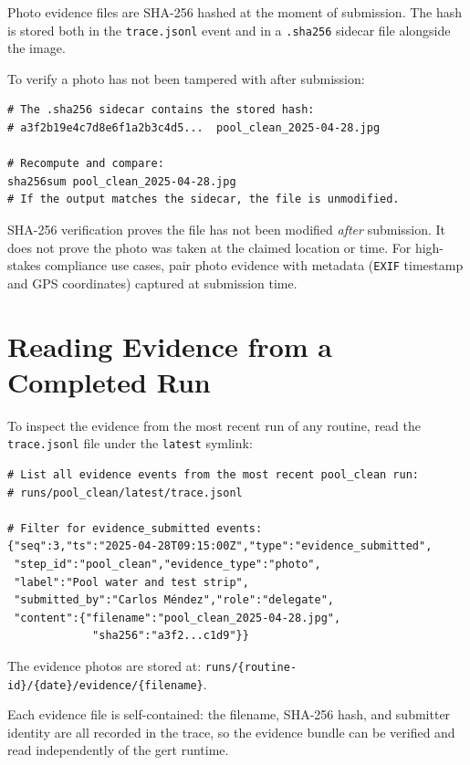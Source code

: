 Photo evidence files are SHA-256 hashed at the moment of submission. The hash is stored both
in the \texttt{trace.jsonl} event and in a \texttt{.sha256} sidecar file alongside the image.

To verify a photo has not been tampered with after submission:

\begin{verbatim}
# The .sha256 sidecar contains the stored hash:
# a3f2b19e4c7d8e6f1a2b3c4d5...  pool_clean_2025-04-28.jpg

# Recompute and compare:
sha256sum pool_clean_2025-04-28.jpg
# If the output matches the sidecar, the file is unmodified.
\end{verbatim}

\begin{tcolorbox}[colback=yellow!10,colframe=orange!70,title=Note]
  SHA-256 verification proves the file has not been modified \emph{after} submission. It does
  not prove the photo was taken at the claimed location or time. For high-stakes compliance
  use cases, pair photo evidence with metadata (\texttt{EXIF} timestamp and GPS coordinates)
  captured at submission time.
\end{tcolorbox}

\section{Reading Evidence from a Completed Run}
\label{sec:evidence-reading}

To inspect the evidence from the most recent run of any routine, read the
\texttt{trace.jsonl} file under the \texttt{latest} symlink:

\begin{verbatim}
# List all evidence events from the most recent pool_clean run:
# runs/pool_clean/latest/trace.jsonl

# Filter for evidence_submitted events:
{"seq":3,"ts":"2025-04-28T09:15:00Z","type":"evidence_submitted",
 "step_id":"pool_clean","evidence_type":"photo",
 "label":"Pool water and test strip",
 "submitted_by":"Carlos Méndez","role":"delegate",
 "content":{"filename":"pool_clean_2025-04-28.jpg",
             "sha256":"a3f2...c1d9"}}
\end{verbatim}

The evidence photos are stored at:
\texttt{runs/\{routine-id\}/\{date\}/evidence/\{filename\}}.

Each evidence file is self-contained: the filename, SHA-256 hash, and submitter identity are
all recorded in the trace, so the evidence bundle can be verified and read independently of
the gert runtime.
